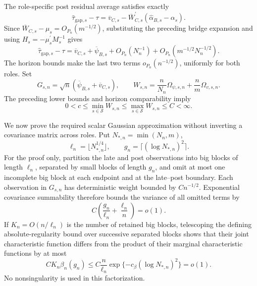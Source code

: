 The role-specific post residual average satisfies exactly
\[
 \widehat\tau_{\mathrm{gap},s}-\tau
 =\overline v_{C,s}
  -\overline W_{C,s}^{\prime}(\widehat\alpha_{B,s}-\alpha_s).
\]
Since \(\overline W_{C,s}-\mu_s=O_{P_n}(m^{-1/2})\), substituting the preceding bridge expansion and using \(H_s=-\mu_s^{\prime}M_s^{-1}\) gives
\[
 \widehat\tau_{\mathrm{gap},s}-\tau
 =\overline v_{C,s}+\overline\psi_{B,s}
  +O_{P_n}(N_n^{-1})
  +O_{P_n}(m^{-1/2}N_n^{-1/2}).
\]
The horizon bounds make the last two terms \(o_{P_n}(n^{-1/2})\), uniformly for both roles.  Set
\[
 G_{s,n}=\sqrt n(\overline\psi_{B,s}+\overline v_{C,s}),
 \qquad
 W_{s,n}=\frac n{N_n}\Omega_{\psi,s,n}
          +\frac nm\Omega_{v,s,n}.
\]
The preceding lower bounds and horizon comparability imply
\[
 0<c\leq\min_{s\in\mathcal S}W_{s,n}
 \leq\max_{s\in\mathcal S}W_{s,n}\leq C<\infty.
\]

We now prove the required scalar Gaussian approximation without inverting a covariance matrix across roles.  Put \(N_{*,n}=\min(N_n,m)\),
\[
 \ell_n=\lfloor N_{*,n}^{1/4}\rfloor,
 \qquad
 g_n=\lceil(\log N_{*,n})^2\rceil.
\]
For the proof only, partition the late and post observations into big blocks of length \(\ell_n\), separated by small blocks of length \(g_n\), and omit at most one incomplete big block at each endpoint and at the late--post boundary.  Each observation in \(G_{s,n}\) has deterministic weight bounded by \(C n^{-1/2}\).  Exponential covariance summability therefore bounds the variance of all omitted terms by
\[
 C\left(\frac{g_n}{\ell_n}+\frac{\ell_n}{n}\right)=o(1).
\]
If \(K_n=O(n/\ell_n)\) is the number of retained big blocks, telescoping the defining absolute-regularity bound over successive separated blocks shows that their joint characteristic function differs from the product of their marginal characteristic functions by at most
\[
 C K_n\beta_n(g_n)
 \leq C\frac n{\ell_n}\exp\{-c_\beta(\log N_{*,n})^2\}=o(1).
\]
No nonsingularity is used in this factorization.

